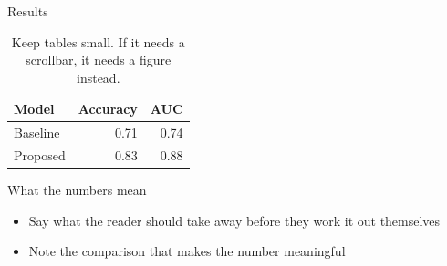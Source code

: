 
\begin{frame}{Results}

\begin{table}
\centering
\begin{tabular}{lrr}
\toprule
\textbf{Model} & \textbf{Accuracy} & \textbf{AUC} \\
\midrule
Baseline       & 0.71 & 0.74 \\
Proposed       & 0.83 & 0.88 \\
\bottomrule
\end{tabular}
\caption{Keep tables small. If it needs a scrollbar, it needs a figure instead.}
\end{table}

\begin{block}{What the numbers mean}
\begin{itemize}
    \item Say what the reader should take away before they work it out themselves
    \item Note the comparison that makes the number meaningful
\end{itemize}
\end{block}

\end{frame}
